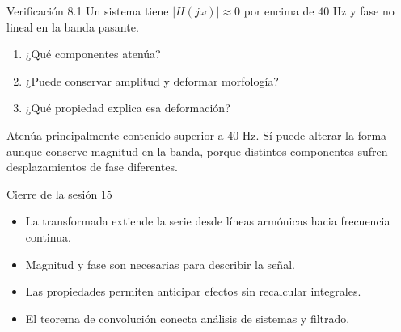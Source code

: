 \documentclass[
  ignorenonframetext,
  aspectratio=169,
  spanish,
  professionalfonts]{beamer}
\providecommand{\tightlist}{%
  \setlength{\itemsep}{0pt}\setlength{\parskip}{0pt}}
\begin{document}
\begin{frame}{Verificación 8.1}
\protect{}\label{verificaciuxf3n-8.1}
Un sistema tiene \(|H(j\omega)|\approx 0\) por encima de \(40\) Hz y
fase no lineal en la banda pasante.

\begin{enumerate}
\tightlist
\item
  ¿Qué componentes atenúa?
\item
  ¿Puede conservar amplitud y deformar morfología?
\item
  ¿Qué propiedad explica esa deformación?
\end{enumerate}

\begin{tcolorbox}[enhanced jigsaw, arc=.35mm, bottomrule=.15mm, bottomtitle=1mm, breakable, colback=white, colbacktitle=quarto-callout-note-color!10!white, colframe=quarto-callout-note-color-frame, coltitle=black, left=2mm, leftrule=.75mm, opacityback=0, opacitybacktitle=0.6, rightrule=.15mm, title={Criterio de respuesta}, titlerule=0mm, toprule=.15mm, toptitle=1mm]

Atenúa principalmente contenido superior a 40 Hz. Sí puede alterar la
forma aunque conserve magnitud en la banda, porque distintos componentes
sufren desplazamientos de fase diferentes.

\end{tcolorbox}
\end{frame}

\begin{frame}{Cierre de la sesión 15}
\protect{}\label{cierre-de-la-sesiuxf3n-15}
\begin{tcolorbox}[enhanced jigsaw, arc=.35mm, bottomrule=.15mm, bottomtitle=1mm, breakable, colback=white, colbacktitle=quarto-callout-important-color!10!white, colframe=quarto-callout-important-color-frame, coltitle=black, left=2mm, leftrule=.75mm, opacityback=0, opacitybacktitle=0.6, rightrule=.15mm, title={Síntesis}, titlerule=0mm, toprule=.15mm, toptitle=1mm]

\begin{itemize}
\tightlist
\item
  La transformada extiende la serie desde líneas armónicas hacia
  frecuencia continua.
\item
  Magnitud y fase son necesarias para describir la señal.
\item
  Las propiedades permiten anticipar efectos sin recalcular integrales.
\item
  El teorema de convolución conecta análisis de sistemas y filtrado.
\end{itemize}

\end{tcolorbox}
\end{frame}
\end{document}
